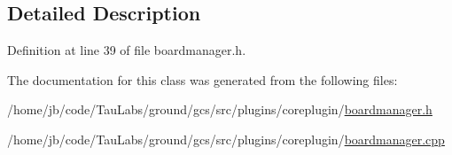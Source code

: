 \subsection{\-Detailed \-Description}


\-Definition at line 39 of file boardmanager.\-h.



\-The documentation for this class was generated from the following files\-:\begin{DoxyCompactItemize}
\item 
/home/jb/code/\-Tau\-Labs/ground/gcs/src/plugins/coreplugin/\hyperlink{boardmanager_8h}{boardmanager.\-h}\item 
/home/jb/code/\-Tau\-Labs/ground/gcs/src/plugins/coreplugin/\hyperlink{boardmanager_8cpp}{boardmanager.\-cpp}\end{DoxyCompactItemize}
